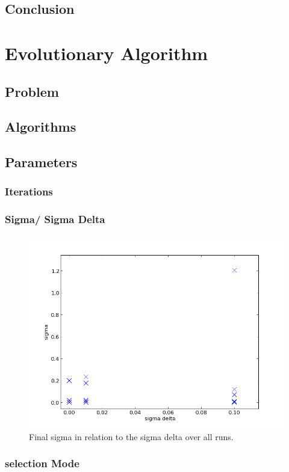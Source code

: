 \documentclass{scrartcl}
\begin{document}
\subsection{Conclusion}




\section{Evolutionary Algorithm}

\subsection{Problem}

\subsection{Algorithms}


\subsection{Parameters}
\subsubsection{Iterations}
\subsubsection{Sigma/ Sigma Delta}

\begin{figure}
 \center
 \includegraphics[width=.5\linewidth]{img/ex4/sigmas.png}
 \caption{Final sigma in relation to the sigma delta over all runs.}
\end{figure}

\subsubsection{selection Mode}
\end{document}
